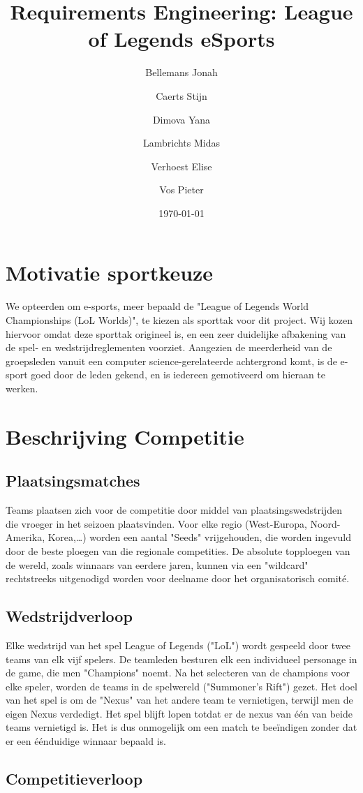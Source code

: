 \documentclass[12pt,a4paper]{article}
\title{Requirements Engineering: League of Legends eSports}
\author{Bellemans Jonah \and Caerts Stijn \and Dimova Yana \and Lambrichts Midas \and Verhoest Elise \and Vos Pieter}
\date{\today}
\begin{document}
	\maketitle
	\newpage
	\tableofcontents
	\newpage
	\section{Motivatie sportkeuze}
		We opteerden om e-sports, meer bepaald de "League of Legends World Championships (LoL Worlds)", te kiezen als sporttak voor dit project. Wij kozen hiervoor omdat deze sporttak origineel is, en een zeer duidelijke afbakening van de spel- en wedstrijdreglementen voorziet. Aangezien de meerderheid van de groepsleden vanuit een computer science-gerelateerde achtergrond komt, is de e-sport goed door de leden gekend, en is iedereen gemotiveerd om hieraan te werken.
	\section{Beschrijving Competitie}
		\subsection{Plaatsingsmatches}
			Teams plaatsen zich voor de competitie door middel van plaatsingswedstrijden die vroeger in het seizoen plaatsvinden. Voor elke regio (West-Europa, Noord-Amerika, Korea,\dots) worden een aantal "Seeds" vrijgehouden, die worden ingevuld door de beste ploegen van die regionale competities. De absolute topploegen van de wereld, zoals winnaars van eerdere jaren, kunnen via een "wildcard" rechtstreeks uitgenodigd worden voor deelname door het organisatorisch comité.
		\subsection{Wedstrijdverloop}
			Elke wedstrijd van het spel League of Legends ("LoL") wordt gespeeld door twee teams van elk vijf spelers. De teamleden besturen elk een individueel personage in de game, die men "Champions" noemt. Na het selecteren van de champions voor elke speler, worden de teams in de spelwereld ("Summoner's Rift") gezet. Het doel van het spel is om de "Nexus" van het andere team te vernietigen, terwijl men de eigen Nexus verdedigt. Het spel blijft lopen totdat er de nexus van één van beide teams vernietigd is. Het is dus onmogelijk om een match te beeïndigen zonder dat er een éénduidige winnaar bepaald is.
		\subsection{Competitieverloop}
\end{document}
